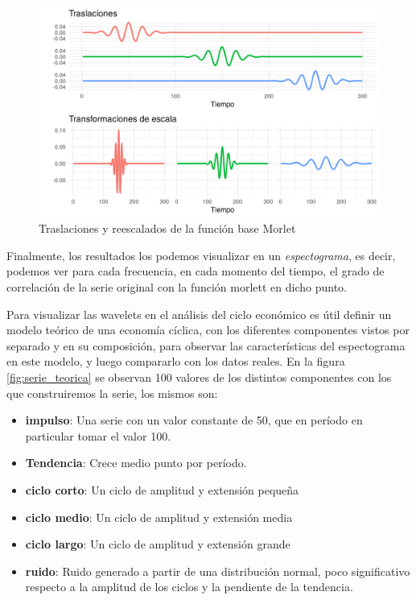 \documentclass[a4paper]{article}
\begin{document}
\begin{figure}[H]
	\centering
	\includegraphics[width=\linewidth]{morelt.png}
	\caption{Traslaciones y reescalados de la función base Morlet} \label{fig:morlet}
\end{figure}


Finalmente, los resultados los podemos visualizar en un \textit{espectograma}, es decir, podemos ver para cada frecuencia, en cada momento del tiempo, el grado de correlación de la serie original con la función morlett en dicho punto.


Para visualizar las wavelets en el análisis del ciclo económico es útil definir un modelo teórico de una economía cíclica, con los diferentes componentes vistos por separado y en su composición, para observar las características del espectograma en este modelo,  y luego compararlo con los datos reales. 
En la figura \ref{fig:serie_teorica} se observan 100 valores de los distintos componentes con los que construiremos la serie, los mismos son:

\begin{itemize}
	\item \textbf{impulso}: Una serie con un valor constante de 50, que en período en particular tomar el valor 100.
	\item \textbf{Tendencia}: Crece medio punto por período.
	\item \textbf{ciclo corto}: Un ciclo de amplitud y extensión pequeña
	\item \textbf{ciclo medio}: Un ciclo de amplitud y extensión media
	\item \textbf{ciclo largo}: Un ciclo de amplitud y extensión grande
	\item \textbf{ruido}: Ruido generado a partir de una distribución normal, poco significativo respecto a la amplitud de los ciclos y la pendiente de la tendencia.
\end{itemize}
\end{document}
